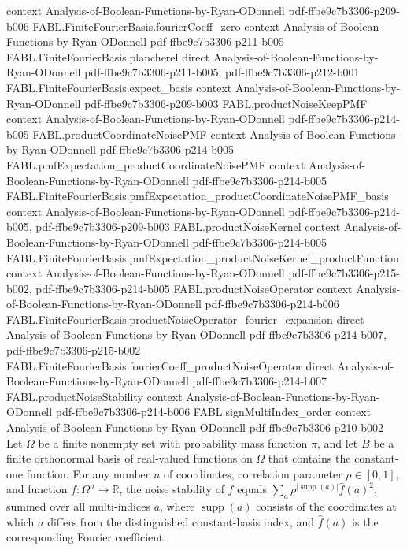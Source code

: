 \begin{theorem}
  {context}
  {Analysis-of-Boolean-Functions-by-Ryan-ODonnell}
  {pdf-ffbe9c7b3306-p209-b006}
\proofstep
  {FABL.FiniteFourierBasis.fourierCoeff_zero}
  {context}
  {Analysis-of-Boolean-Functions-by-Ryan-ODonnell}
  {pdf-ffbe9c7b3306-p211-b005}
\proofstep
  {FABL.FiniteFourierBasis.plancherel}
  {direct}
  {Analysis-of-Boolean-Functions-by-Ryan-ODonnell}
  {pdf-ffbe9c7b3306-p211-b005,
    pdf-ffbe9c7b3306-p212-b001}
\proofstep
  {FABL.FiniteFourierBasis.expect_basis}
  {context}
  {Analysis-of-Boolean-Functions-by-Ryan-ODonnell}
  {pdf-ffbe9c7b3306-p209-b003}
\proofstep
  {FABL.productNoiseKeepPMF}
  {context}
  {Analysis-of-Boolean-Functions-by-Ryan-ODonnell}
  {pdf-ffbe9c7b3306-p214-b005}
\proofstep
  {FABL.productCoordinateNoisePMF}
  {context}
  {Analysis-of-Boolean-Functions-by-Ryan-ODonnell}
  {pdf-ffbe9c7b3306-p214-b005}
\proofstep
  {FABL.pmfExpectation_productCoordinateNoisePMF}
  {context}
  {Analysis-of-Boolean-Functions-by-Ryan-ODonnell}
  {pdf-ffbe9c7b3306-p214-b005}
\proofstep
  {FABL.FiniteFourierBasis.pmfExpectation_productCoordinateNoisePMF_basis}
  {context}
  {Analysis-of-Boolean-Functions-by-Ryan-ODonnell}
  {pdf-ffbe9c7b3306-p214-b005,
    pdf-ffbe9c7b3306-p209-b003}
\proofstep
  {FABL.productNoiseKernel}
  {context}
  {Analysis-of-Boolean-Functions-by-Ryan-ODonnell}
  {pdf-ffbe9c7b3306-p214-b005}
\proofstep
  {FABL.FiniteFourierBasis.pmfExpectation_productNoiseKernel_productFunction}
  {context}
  {Analysis-of-Boolean-Functions-by-Ryan-ODonnell}
  {pdf-ffbe9c7b3306-p215-b002,
    pdf-ffbe9c7b3306-p214-b005}
\proofstep
  {FABL.productNoiseOperator}
  {context}
  {Analysis-of-Boolean-Functions-by-Ryan-ODonnell}
  {pdf-ffbe9c7b3306-p214-b006}
\proofstep
  {FABL.FiniteFourierBasis.productNoiseOperator_fourier_expansion}
  {direct}
  {Analysis-of-Boolean-Functions-by-Ryan-ODonnell}
  {pdf-ffbe9c7b3306-p214-b007,
    pdf-ffbe9c7b3306-p215-b002}
\proofstep
  {FABL.FiniteFourierBasis.fourierCoeff_productNoiseOperator}
  {direct}
  {Analysis-of-Boolean-Functions-by-Ryan-ODonnell}
  {pdf-ffbe9c7b3306-p214-b007}
\proofstep
  {FABL.productNoiseStability}
  {context}
  {Analysis-of-Boolean-Functions-by-Ryan-ODonnell}
  {pdf-ffbe9c7b3306-p214-b006}
\proofstep
  {FABL.signMultiIndex_order}
  {context}
  {Analysis-of-Boolean-Functions-by-Ryan-ODonnell}
  {pdf-ffbe9c7b3306-p210-b002}
Let $\Omega$ be a finite nonempty set with probability mass function $\pi$, and let $B$
be a finite orthonormal basis of real-valued functions on $\Omega$ that contains the
constant-one function. For any number $n$ of coordinates, correlation parameter
$\rho\in[0,1]$, and function $f\colon\Omega^n\to\mathbb R$, the noise stability of $f$
equals $\sum_a \rho^{|\operatorname{supp}(a)|}\widehat f(a)^2$, summed over all
multi-indices $a$, where $\operatorname{supp}(a)$ consists of the coordinates at which
$a$ differs from the distinguished constant-basis index, and $\widehat f(a)$ is the
corresponding Fourier coefficient.
\end{theorem}

